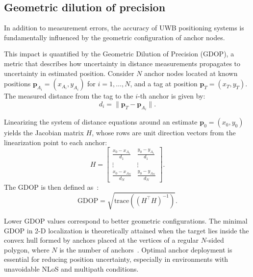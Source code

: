 \subsection{Geometric dilution of precision}
In addition to measurement errors, the accuracy of UWB positioning systems is fundamentally influenced by the geometric configuration of anchor nodes.

This impact is quantified by the Geometric Dilution of Precision (GDOP), a metric that describes how uncertainty in distance measurements propagates to uncertainty in estimated position. Consider $N$ anchor nodes located at known positions $\mathbf{p}_{A_i} = (x_{A_i}, y_{A_i})$ for $i = 1, \dots, N$, and a tag at position $\mathbf{p}_T = (x_T, y_T)$. The measured distance from the tag to the $i$-th anchor is given by:
\begin{equation}
d_i = \|\mathbf{p}_T - \mathbf{p}_{A_i}\|.
\end{equation}

Linearizing the system of distance equations around an estimate $\mathbf{p}_0 = (x_0, y_0)$ yields the Jacobian matrix $H$, whose rows are unit direction vectors from the linearization point to each anchor:
\begin{equation}
H = \begin{bmatrix}
\frac{x_0 - x_{A_1}}{d_1} & \frac{y_0 - y_{A_1}}{d_1} \\
\vdots & \vdots \\
\frac{x_0 - x_{A_N}}{d_N} & \frac{y_0 - y_{A_N}}{d_N}
\end{bmatrix}.
\end{equation}
The GDOP is then defined as~\cite{Wang2022GDOP}:
\begin{equation}
\text{GDOP} = \sqrt{\text{trace}\left((H^\top H)^{-1}\right)}.
\end{equation}

Lower GDOP values correspond to better geometric configurations. The minimal GDOP in 2-D localization is theoretically attained when the target lies inside the convex hull formed by anchors placed at the vertices of a regular $N$-sided polygon, where $N$ is the number of anchors~\cite{Wang2022GDOP,Levanon2000GDOP}. Optimal anchor deployment is essential for reducing position uncertainty, especially in environments with unavoidable NLoS and multipath conditions.
